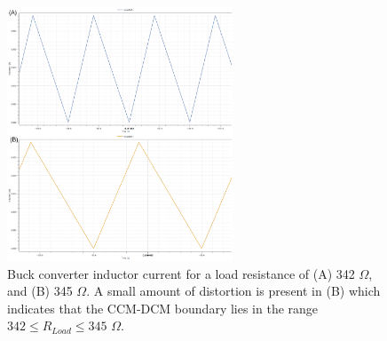 \documentclass[12pt,twoside]{scrartcl}
\begin{document}
\begin{figure}[h]
    \centering
    \includegraphics[width=0.6\textwidth]{buck_DCM}
    \caption{Buck converter inductor current for a load resistance of (A) 342 $\Omega$, and (B) 345 $\Omega$. A small amount of distortion is present in (B) which indicates that the CCM-DCM boundary lies in the range $342 \le R_{Load} \le 345$ $\Omega$.}
    \label{fig:buck_DCM}
\end{figure}
\newpage
\end{document}
